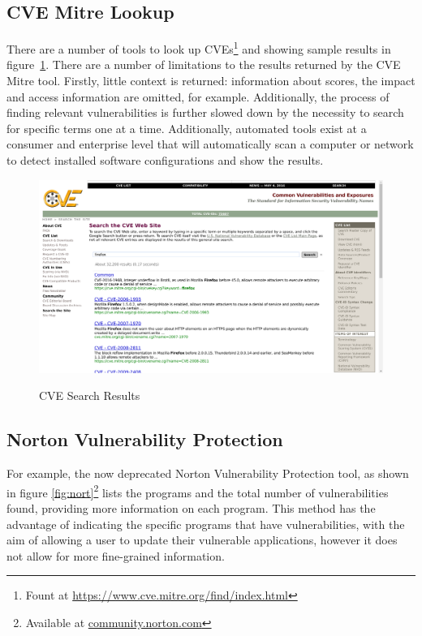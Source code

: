 \subsection{CVE Mitre Lookup}

There are a number of tools to look up CVEs\footnote{Fount at
	\url{https://www.cve.mitre.org/find/index.html}} and showing sample
results in figure~\ref{fig:cve}.  There are a number of limitations to the
results returned by the CVE Mitre tool.  Firstly, little context is returned:
information about scores, the impact and access information are omitted, for
example.  Additionally, the process of finding relevant vulnerabilities is
further slowed down by the necessity to search for specific terms one at a
time.  Additionally, automated tools exist at a consumer and enterprise level
that will automatically scan a computer or network to detect installed software
configurations and show the results.  

\begin{figure} \centering \includegraphics[width=0.8\linewidth]{cve-lookup}
	\label{fig:cve} \caption{CVE Search Results} \end{figure}

\subsection{Norton Vulnerability Protection}

For example, the now deprecated Norton Vulnerability Protection tool, as shown
in figure \ref{fig:nort}\footnote{Available at \url{community.norton.com}}
lists the programs and the total number of  vulnerabilities found, providing
more information on each program.  This method has the advantage of indicating
the specific programs that have vulnerabilities, with the aim of allowing a
user to update their vulnerable applications, however it does not allow for
more fine-grained information.


